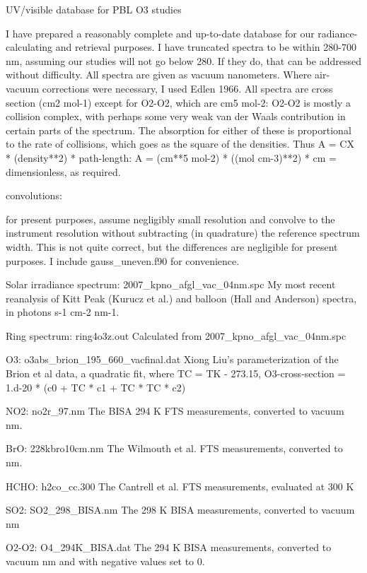 UV/visible database for PBL O3 studies

I have prepared a reasonably complete and up-to-date database for our
radiance-calculating and retrieval purposes. I have truncated spectra
to be within 280-700 nm, assuming our studies will not go below
280. If they do, that can be addressed without difficulty. All spectra
are given as vacuum nanometers. Where air-vacuum corrections were
necessary, I used Edlen 1966. All spectra are cross section (cm2
mol-1) except for O2-O2, which are cm5 mol-2: O2-O2 is mostly a
collision complex, with perhaps some very weak van der Waals
contribution in certain parts of the spectrum. The absorption for
either of these is proportional to the rate of collisions, which goes
as the square of the densities. Thus A = CX * (density**2) *
path-length: A = (cm**5 mol-2) * ((mol cm-3)**2) * cm = dimensionless,
as required.

convolutions:

for present purposes, assume negligibly small resolution and convolve
to the instrument resolution without subtracting (in quadrature) the
reference spectrum width. This is not quite correct, but the
differences are negligible for present purposes. I include
gauss_uneven.f90 for convenience.

Solar irradiance spectrum: 2007_kpno_afgl_vac_04nm.spc
My most recent reanalysis of Kitt Peak (Kurucz et al.)  and balloon
(Hall and Anderson) spectra, in photons s-1 cm-2 nm-1.

Ring spectrum: ring4o3z.out
Calculated from 2007_kpno_afgl_vac_04nm.spc

O3: o3abs_brion_195_660_vacfinal.dat
Xiong Liu's parameterization of the Brion et al data, a quadratic fit,
where TC = TK - 273.15, O3-cross-section = 1.d-20 * (c0 + TC * c1 + TC
* TC * c2)

NO2: no2r_97.nm
The BISA 294 K FTS measurements, converted to vacuum nm.

BrO: 228kbro10cm.nm
The Wilmouth et al. FTS measurements, converted to nm.

HCHO: h2co_cc.300
The Cantrell et al. FTS measurements, evaluated at 300 K

SO2: SO2_298_BISA.nm
The 298 K BISA measurements, converted to vacuum nm

O2-O2: O4_294K_BISA.dat
The 294 K BISA measurements, converted to vacuum nm and with negative
values set to 0.

